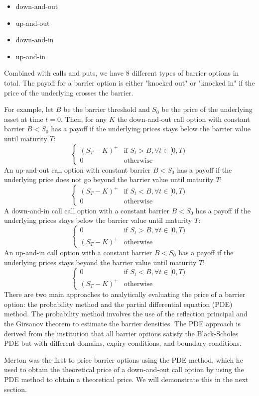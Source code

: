 \begin{itemize}
	\item down-and-out
	\item up-and-out
	\item down-and-in
	\item up-and-in
\end{itemize}

Combined with calls and puts, we have 8 different types of barrier options in total. The payoff for a barrier option is either "knocked out" or "knocked in" if the price of the underlying crosses the barrier. 

For example, let $B$ be the barrier threshold and $S_0$ be the price of the underlying asset at time $t=0$. Then, for any $K$ the down-and-out call option with constant barrier $B<S_0$ has a payoff if the underlying prices stays below the barrier value until maturity $T$:
\begin{equation}
	\begin{cases}
	\left(S_T-K\right)^+  & \text{if }S_t>B,\forall t\in[0,T) \\
	0 & \text{otherwise}
	\end{cases}
\end{equation}
An up-and-out call option with constant barrier $B<S_0$ has a payoff if the underlying price does not go beyond the barrier value until maturity $T$:
\begin{equation}
	\begin{cases}
		\left(S_T-K\right)^+  & \text{if }S_t<B,\forall t\in[0,T) \\
		0 & \text{otherwise}
	\end{cases}
\end{equation}
A down-and-in call call option with a constant barrier $B<S_0$ has a payoff if the underlying prices stays below the barrier value until maturity $T$:
\begin{equation}
	\begin{cases}
		0 & \text{if }S_t>B,\forall t\in[0,T) \\
		\left(S_T-K\right)^+ & \text{otherwise}
	\end{cases}
\end{equation}
An up-and-in call option with a constant barrier $B<S_0$ has a payoff if the underlying prices stays beyond the barrier value until maturity $T$:
\begin{equation}
	\begin{cases}
		0 & \text{if }S_t<B,\forall t\in[0,T) \\
		\left(S_T-K\right)^+ & \text{otherwise}
	\end{cases}
\end{equation}
There are two main approaches to analytically evaluating the price of a barrier option: the probability method and the partial differential equation (PDE) method. The probability method involves the use of the reflection principal and the Girsanov theorem to estimate the barrier densities. The PDE approach is derived from the institution that all barrier options satisfy the Black-Scholes PDE but with different domains, expiry conditions, and boundary conditions.

Merton was the first to price barrier options using the PDE method, which he used to obtain the theoretical price of a down-and-out call option by using the PDE method to obtain a theoretical price. We will demonstrate this in the next section.